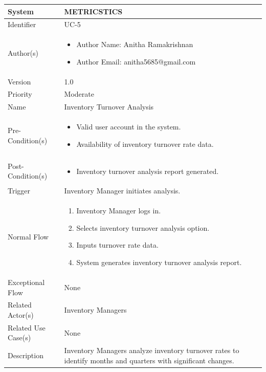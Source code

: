 \begin{center}
	\begin{tabularx}{\textwidth}{|l|X|}
		\hline
		System & METRICSTICS \\
		\hline
		Identifier & UC-5 \\
		\hline
		Author(s) & \begin{itemize}[left=0pt]
			\item Author Name: Anitha Ramakrishnan
			\item Author Email: anitha5685@gmail.com
		\end{itemize} \\
		\hline
		Version & 1.0 \\
		\hline
		Priority & Moderate \\
		\hline
		Name & Inventory Turnover Analysis \\
		\hline
		Pre-Condition(s) &  \begin{itemize}[left=0pt]
			\item Valid user account in the system.
			\item Availability of inventory turnover rate data.
		\end{itemize} \\
		\hline
		Post-Condition(s) & \begin{itemize}[left=0pt]
			\item Inventory turnover analysis report generated.
		\end{itemize} \\
		\hline
		Trigger & Inventory Manager initiates analysis. \\
		\hline
		Normal Flow & \begin{enumerate}[left=0pt]
			\item Inventory Manager logs in.
			\item Selects inventory turnover analysis option.
			\item Inputs turnover rate data.
			\item System generates inventory turnover analysis report.
		\end{enumerate} \\
		\hline
		Exceptional Flow & None \\
		\hline
		Related Actor(s) & Inventory Managers \\
		\hline
		Related Use Case(s) & None \\
		\hline
		Description & Inventory Managers analyze inventory turnover rates to identify months and quarters with significant changes. \\
		\hline
	\end{tabularx}
\end{center}

